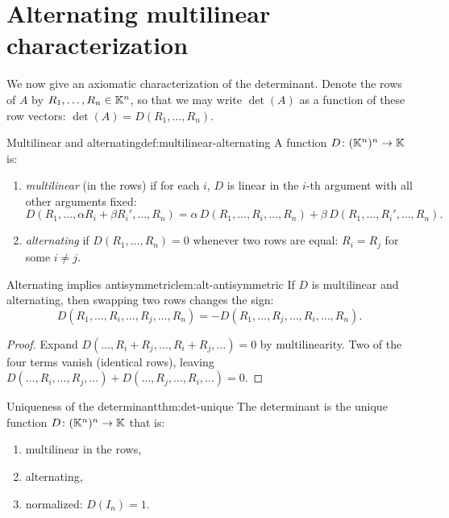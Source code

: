 \section{Alternating multilinear characterization}\label{sec:multilinear}

We now give an axiomatic characterization of the determinant. Denote
the rows of $A$ by $R_1,\ldots,R_n\in{\mathbb{K}}^n$, so that we may write
$\det(A)$ as a function of these row vectors:
$\det(A) = D(R_1,\ldots,R_n)$.

\begin{definition}{Multilinear and alternating}{def:multilinear-alternating}
A function $D\colon ({\mathbb{K}}^n)^n \to {\mathbb{K}}$ is:
\begin{enumerate}[label=(\roman*)]
  \item \emph{multilinear} (in the rows) if for each $i$,
    $D$ is linear in the $i$-th argument with all other arguments fixed:
    \[
      D(R_1,\ldots,\alpha R_i + \beta R_i',\ldots,R_n)
      = \alpha\,D(R_1,\ldots,R_i,\ldots,R_n)
        + \beta\,D(R_1,\ldots,R_i',\ldots,R_n).
    \]
  \item \emph{alternating} if $D(R_1,\ldots,R_n)=0$ whenever two rows
    are equal: $R_i = R_j$ for some $i\neq j$.
\end{enumerate}
\end{definition}

\begin{lemma}{Alternating implies antisymmetric}{lem:alt-antisymmetric}
If $D$ is multilinear and alternating, then swapping two rows changes
the sign:
\[
  D(R_1,\ldots,R_i,\ldots,R_j,\ldots,R_n)
  = -D(R_1,\ldots,R_j,\ldots,R_i,\ldots,R_n).
\]
\end{lemma}

\begin{proof}
Expand $D(\ldots,R_i+R_j,\ldots,R_i+R_j,\ldots) = 0$ by multilinearity.
Two of the four terms vanish (identical rows), leaving
$D(\ldots,R_i,\ldots,R_j,\ldots) + D(\ldots,R_j,\ldots,R_i,\ldots) = 0$.
\end{proof}

\begin{theorem}{Uniqueness of the determinant}{thm:det-unique}
The determinant is the unique function
$D\colon ({\mathbb{K}}^n)^n \to {\mathbb{K}}$ that is:
\begin{enumerate}[label=(\roman*)]
  \item multilinear in the rows,
  \item alternating,
  \item normalized: $D(I_n)=1$.
\end{enumerate}
\end{theorem}

